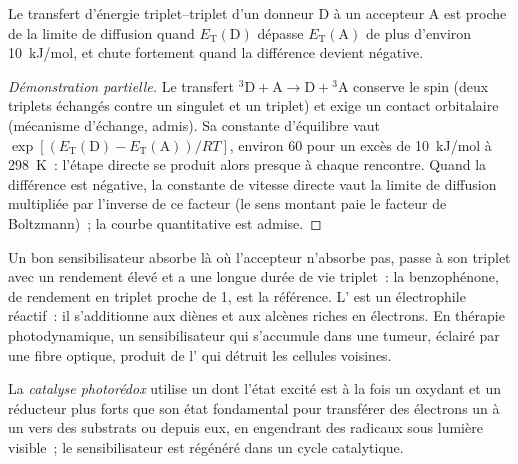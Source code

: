 \begin{proposition}\label{prop:b3:photochemistry:sensitisation-condition}
Le transfert d'énergie triplet--triplet d'un donneur D à un accepteur A
est proche de la limite de diffusion quand $E_{\mathrm T}(\mathrm D)$
dépasse $E_{\mathrm T}(\mathrm A)$ de plus d'environ \qty{10}{kJ/mol},
et chute fortement quand la différence devient négative.
\end{proposition}

\begin{proof}[Démonstration partielle]
Le transfert ${}^3\mathrm D + \mathrm A \to \mathrm D + {}^3\mathrm A$
conserve le spin (deux triplets échangés contre un singulet et un
triplet) et exige un contact orbitalaire (mécanisme d'échange, admis).
Sa constante d'équilibre vaut $\exp[(E_{\mathrm T}(\mathrm D) - E_{\mathrm T}(\mathrm A))/RT]$,
environ 60 pour un excès de
\qty{10}{kJ/mol} à \qty{298}{K}~: l'étape directe se produit alors
presque à chaque rencontre. Quand la différence est négative, la
constante de vitesse directe vaut la limite de diffusion multipliée par
l'inverse de ce facteur (le sens montant paie le facteur de
Boltzmann)~; la courbe quantitative est admise.
\end{proof}

Un bon sensibilisateur absorbe là où l'accepteur n'absorbe pas, passe à
son triplet avec un rendement élevé et a une longue durée de vie
triplet~: la benzophénone, de rendement en triplet proche de 1, est la
référence. L' est un électrophile réactif~: il
s'additionne aux diènes et aux alcènes riches en électrons. En thérapie
photodynamique, un sensibilisateur qui s'accumule dans une tumeur,
éclairé par une fibre optique, produit de l' qui détruit
les cellules voisines.

\begin{definition}\label{def:b3:photochemistry:photoredox}
La \emph{catalyse photorédox} utilise un 
dont l'état excité est à la fois un oxydant et un réducteur plus forts
que son état fondamental pour transférer des électrons un à un vers des
substrats ou depuis eux, en engendrant des radicaux sous lumière
visible~; le sensibilisateur est régénéré dans un cycle catalytique.
\end{definition}


